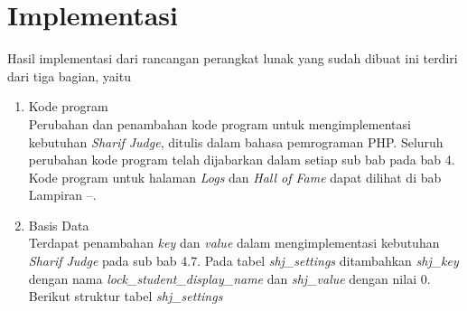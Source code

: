 \section{Implementasi}
Hasil implementasi dari rancangan perangkat lunak yang sudah dibuat ini terdiri dari tiga bagian, yaitu
\begin{enumerate}
	\item Kode program \\
	Perubahan dan penambahan kode program untuk mengimplementasi kebutuhan \textit{Sharif Judge}, ditulis dalam bahasa pemrograman PHP. Seluruh perubahan kode program telah dijabarkan dalam setiap sub bab pada bab 4. Kode program untuk halaman \textit{Logs} dan \textit{Hall of Fame} dapat dilihat di bab Lampiran --.
	\item Basis Data \\
	Terdapat penambahan \textit{key} dan \textit{value} dalam mengimplementasi kebutuhan \textit{Sharif Judge} pada sub bab 4.7. Pada tabel \textit{shj\_settings} ditambahkan \textit{shj\_key} dengan nama \textit{lock\_student\_display\_name} dan \textit{shj\_value} dengan nilai 0. Berikut struktur tabel \textit{shj\_settings}
	

\end{enumerate}
